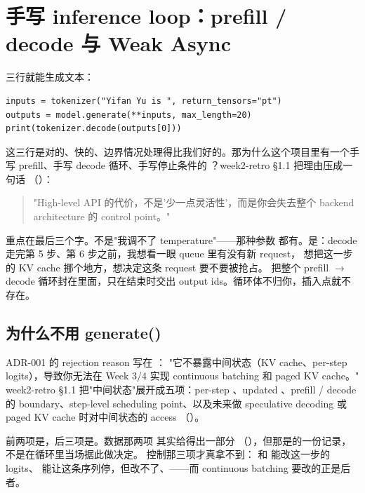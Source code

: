 \section{手写 inference loop：prefill / decode 与 Weak Async}
\label{sec:a-loop}

三行就能生成文本：

\begin{lstlisting}[style=hlplain]
inputs = tokenizer("Yifan Yu is ", return_tensors="pt")
outputs = model.generate(**inputs, max_length=20)
print(tokenizer.decode(outputs[0]))
\end{lstlisting}

这三行是对的、快的、边界情况处理得比我们好的。那为什么这个项目里有一个手写 prefill、手写
decode 循环、手写停止条件的 ？week2-retro §1.1 把理由压成一句话
（）：

\begin{quote}
"High-level API 的代价，不是'少一点灵活性'，而是你会失去整个 backend architecture 的 control
point。"
\end{quote}

重点在最后三个字。不是"我调不了 temperature"——那种参数  都有。是：decode 走完第 5 步、第 6 步之前，我想看一眼 queue 里有没有新 request，
想把这一步的 KV cache 挪个地方，想决定这条 request 要不要被抢占。 把整个
prefill $\to$ decode 循环封在里面，只在结束时交出 output ids。循环体不归你，插入点就不存在。

\subsection{为什么不用 generate()}
\label{sec:a-loop-why-not-generate}

ADR-001 的 rejection reason 写在 ：
"它不暴露中间状态（KV cache、per-step logits），导致你无法在 Week 3/4 实现 continuous batching
和 paged KV cache。" week2-retro §1.1 把"中间状态"展开成五项：per-step 、updated
、prefill / decode 的 boundary、step-level scheduling point、以及未来做
speculative decoding 或 paged KV cache 时对中间状态的 access
（）。

前两项是，后三项是。数据那两项  其实给得出一部分
（），但那是的一份记录，不是在循环里当场据此做决定。
控制那三项才真拿不到： 和  能改这一步的 logits、
能让这条序列停，但改不了、——而 continuous
batching 要改的正是后者。

